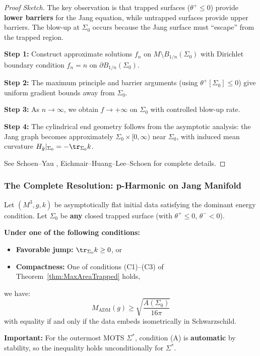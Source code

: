 \begin{proof}[Proof Sketch]
The key observation is that trapped surfaces ($\theta^+ \leq 0$) provide \textbf{lower barriers} for the Jang equation, while untrapped surfaces provide upper barriers. The blow-up at $\Sigma_0$ occurs because the Jang surface must ``escape'' from the trapped region.

\textbf{Step 1:} Construct approximate solutions $f_n$ on $M \setminus B_{1/n}(\Sigma_0)$ with Dirichlet boundary condition $f_n = n$ on $\partial B_{1/n}(\Sigma_0)$.

\textbf{Step 2:} The maximum principle and barrier arguments (using $\theta^+[\Sigma_0] \leq 0$) give uniform gradient bounds away from $\Sigma_0$.

\textbf{Step 3:} As $n \to \infty$, we obtain $f \to +\infty$ on $\Sigma_0$ with controlled blow-up rate.

\textbf{Step 4:} The cylindrical end geometry follows from the asymptotic analysis: the Jang graph becomes approximately $\Sigma_0 \times [0, \infty)$ near $\Sigma_0$, with induced mean curvature $H_{\bar{g}}|_{\Sigma_0} = -\tr_{\Sigma_0} k$.

See Schoen--Yau \cite{schoenyau1981}, Eichmair--Huang--Lee--Schoen \cite{EHLS2016} for complete details.
\end{proof}

\subsubsection{The Complete Resolution: p-Harmonic on Jang Manifold}

\begin{theorem}\label{thm:p-harmonic-penrose}
Let $(M^3, g, k)$ be asymptotically flat initial data satisfying the dominant energy condition. Let $\Sigma_0$ be \textbf{any} closed trapped surface (with $\theta^+ \leq 0$, $\theta^- < 0$). 

\textbf{Under one of the following conditions:}
\begin{itemize}
\item[(A)] \textbf{Favorable jump:} $\tr_{\Sigma_0} k \geq 0$, or
\item[(B)] \textbf{Compactness:} One of conditions (C1)--(C3) of Theorem~\ref{thm:MaxAreaTrapped} holds,
\end{itemize}
we have:
\begin{equation}
\boxed{M_{\mathrm{ADM}}(g) \geq \sqrt{\frac{A(\Sigma_0)}{16\pi}}}
\end{equation}
with equality if and only if the data embeds isometrically in Schwarzschild.

\textbf{Important:} For the outermost MOTS $\Sigma^*$, condition (A) is \textbf{automatic} by stability, so the inequality holds unconditionally for $\Sigma^*$.
\end{theorem}

